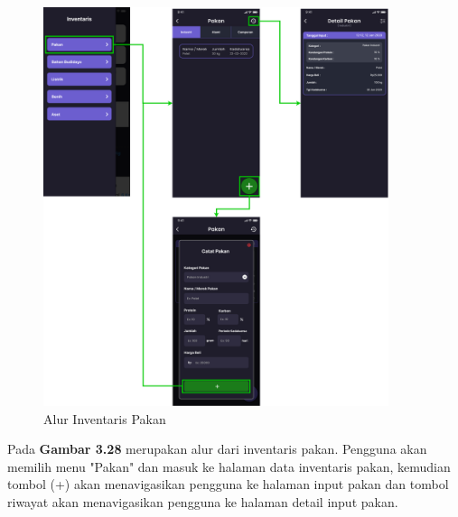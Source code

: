 \begin{spacing}{1.5}
	\begin{figure}[H]
		\centering
		\includegraphics[width=0.9\textwidth]{gambar/sprint2/flow_feed.png}
		\caption{Alur Inventaris Pakan}
	\end{figure}

	Pada \textbf{Gambar 3.28} merupakan alur dari inventaris pakan. Pengguna akan memilih menu "Pakan" dan masuk ke halaman data inventaris pakan, kemudian tombol (+) akan menavigasikan pengguna ke halaman input pakan dan tombol riwayat akan menavigasikan pengguna ke halaman detail input pakan.


\end{spacing}
